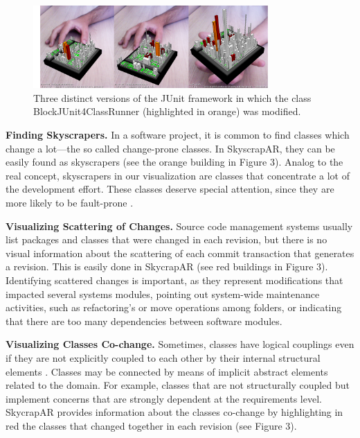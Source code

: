 \begin{figure}[t]
 \centering
 \includegraphics[width=0.8\textwidth, bb=14 14 2114 755]{./images/applications}
 \caption{Three distinct versions of the JUnit framework in which the class BlockJUnit4ClassRunner (highlighted in orange) was modified.}
 \label{fig:TOBEDEFINED}
\end{figure}

\textbf{Finding Skyscrapers.} In a software project, it is common to find classes which change a lot---the so called change-prone classes. In SkyscrapAR, they can be easily found as skyscrapers (see the orange building in Figure 3). Analog to the real concept, skyscrapers in our visualization are classes that concentrate a lot of the development effort. These classes deserve special attention, since they are more likely to be fault-prone \cite{nagappan:2005}. 

\textbf{Visualizing Scattering of Changes.} Source code management systems usually list packages and classes that were changed in each revision, but there is no visual information about the scattering of each commit transaction that generates a revision. This is easily done in SkycrapAR (see red buildings in Figure 3). Identifying scattered changes is important, as they represent modifications that impacted several systems modules, pointing out system-wide maintenance activities, such as refactoring's or move operations among folders, or indicating that there are too many dependencies between software modules.

\textbf{Visualizing Classes Co-change.} Sometimes, classes have logical couplings even if they are not explicitly coupled to each other by their internal structural elements \cite{gall:1998}. Classes may be connected by means of implicit abstract elements related to the domain. For example, classes that are not structurally coupled but implement concerns that are strongly dependent at the requirements level. SkycrapAR provides information about the classes co-change by highlighting in red the classes that changed together in each revision (see Figure 3). 

